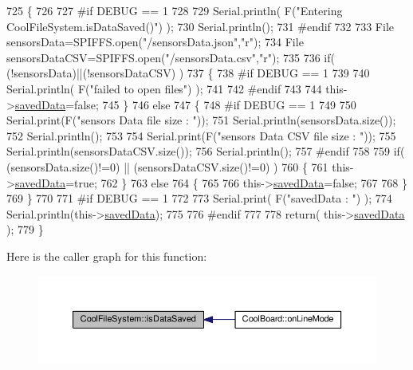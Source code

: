 \begin{DoxyCode}
725 \{
726 
727 \textcolor{preprocessor}{#if DEBUG == 1 }
728 
729     Serial.println( F(\textcolor{stringliteral}{"Entering CoolFileSystem.isDataSaved()"}) );
730     Serial.println();
731 \textcolor{preprocessor}{#endif}
732 
733     File sensorsData=SPIFFS.open(\textcolor{stringliteral}{"/sensorsData.json"},\textcolor{stringliteral}{"r"});
734     File sensorsDataCSV=SPIFFS.open(\textcolor{stringliteral}{"/sensorsData.csv"},\textcolor{stringliteral}{"r"});
735     
736     \textcolor{keywordflow}{if}( (!sensorsData)||(!sensorsDataCSV) ) 
737     \{
738 \textcolor{preprocessor}{    #if DEBUG == 1}
739 
740         Serial.println( F(\textcolor{stringliteral}{"failed to open files"}) );
741 
742 \textcolor{preprocessor}{    #endif}
743         
744         this->\hyperlink{classCoolFileSystem_ad398e0c5c41a0c88acdf5d672aa71351}{savedData}=\textcolor{keyword}{false};
745     \}
746     \textcolor{keywordflow}{else}
747     \{       
748 \textcolor{preprocessor}{        #if DEBUG == 1}
749 
750             Serial.print(F(\textcolor{stringliteral}{"sensors Data file size : "}));
751             Serial.println(sensorsData.size());
752             Serial.println();
753             
754             Serial.print(F(\textcolor{stringliteral}{"sensors Data CSV file size : "}));               
755             Serial.println(sensorsDataCSV.size());
756             Serial.println();
757 \textcolor{preprocessor}{        #endif  }
758 
759         \textcolor{keywordflow}{if}( (sensorsData.size()!=0) || (sensorsDataCSV.size()!=0) )
760         \{
761             this->\hyperlink{classCoolFileSystem_ad398e0c5c41a0c88acdf5d672aa71351}{savedData}=\textcolor{keyword}{true};
762         \}
763         \textcolor{keywordflow}{else}
764         \{
765 
766             this->\hyperlink{classCoolFileSystem_ad398e0c5c41a0c88acdf5d672aa71351}{savedData}=\textcolor{keyword}{false};     
767         
768         \}   
769     \}
770 
771 \textcolor{preprocessor}{#if DEBUG == 1 }
772 
773     Serial.print( F(\textcolor{stringliteral}{"savedData : "}) );
774     Serial.println(this->\hyperlink{classCoolFileSystem_ad398e0c5c41a0c88acdf5d672aa71351}{savedData});
775 
776 \textcolor{preprocessor}{#endif}
777 
778     \textcolor{keywordflow}{return}( this->\hyperlink{classCoolFileSystem_ad398e0c5c41a0c88acdf5d672aa71351}{savedData} );
779 \}
\end{DoxyCode}
Here is the caller graph for this function\+:\nopagebreak
\begin{figure}[H]
\begin{center}
\leavevmode
\includegraphics[width=350pt]{classCoolFileSystem_a5a7eaeea7a9fbf8aaef651d862fa3b5b_icgraph}
\end{center}
\end{figure}
